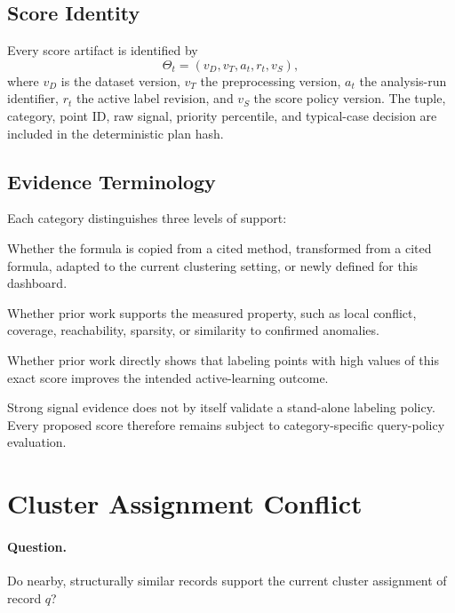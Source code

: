 \documentclass[11pt]{article}
\begin{document}
\subsection{Score Identity}

Every score artifact is identified by
\begin{equation}
    \Theta_t
    =
    (v_D,v_T,a_t,r_t,v_S),
\end{equation}
where $v_D$ is the dataset version, $v_T$ the preprocessing version, $a_t$ the
analysis-run identifier, $r_t$ the active label revision, and $v_S$ the score
policy version. The tuple, category, point ID, raw signal, priority percentile,
and typical-case decision are included in the deterministic plan hash.

\subsection{Evidence Terminology}

Each category distinguishes three levels of support:
\begin{description}[leftmargin=3.8cm,style=nextline]
    \item[Formula provenance]
    Whether the formula is copied from a cited method, transformed from a cited
    formula, adapted to the current clustering setting, or newly defined for
    this dashboard.

    \item[Signal evidence]
    Whether prior work supports the measured property, such as local conflict,
    coverage, reachability, sparsity, or similarity to confirmed anomalies.

    \item[Query-policy evidence]
    Whether prior work directly shows that labeling points with high values of
    this exact score improves the intended active-learning outcome.
\end{description}

Strong signal evidence does not by itself validate a stand-alone labeling
policy. Every proposed score therefore remains subject to category-specific
query-policy evaluation.

\section{Cluster Assignment Conflict}

\paragraph{Question.}
Do nearby, structurally similar records support the current cluster assignment
of record $q$?
\end{document}
